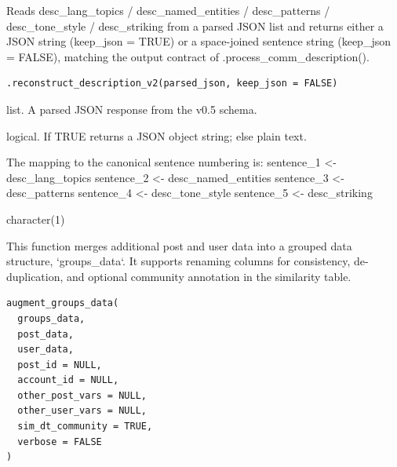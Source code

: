 \documentclass[a4paper]{book}
\begin{document}
%
\begin{Description}
Reads desc\_lang\_topics / desc\_named\_entities / desc\_patterns /
desc\_tone\_style / desc\_striking from a parsed JSON list and returns either
a JSON string (keep\_json = TRUE) or a space-joined sentence string
(keep\_json = FALSE), matching the output contract of .process\_comm\_description().
\end{Description}
%
\begin{Usage}
\begin{verbatim}
.reconstruct_description_v2(parsed_json, keep_json = FALSE)
\end{verbatim}
\end{Usage}
%
\begin{Arguments}
\begin{ldescription}
\item[\code{parsed\_json}] list. A parsed JSON response from the v0.5 schema.

\item[\code{keep\_json}] logical. If TRUE returns a JSON object string; else plain text.
\end{ldescription}
\end{Arguments}
%
\begin{Details}
The mapping to the canonical sentence numbering is:
sentence\_1 <- desc\_lang\_topics
sentence\_2 <- desc\_named\_entities
sentence\_3 <- desc\_patterns
sentence\_4 <- desc\_tone\_style
sentence\_5 <- desc\_striking
\end{Details}
%
\begin{Value}
character(1)
\end{Value}
%
\begin{Description}
This function merges additional post and user data into a grouped data structure, `groups\_data`.
It supports renaming columns for consistency, de-duplication, and optional community annotation in the similarity table.
\end{Description}
%
\begin{Usage}
\begin{verbatim}
augment_groups_data(
  groups_data,
  post_data,
  user_data,
  post_id = NULL,
  account_id = NULL,
  other_post_vars = NULL,
  other_user_vars = NULL,
  sim_dt_community = TRUE,
  verbose = FALSE
)
\end{verbatim}
\end{Usage}
\end{document}
